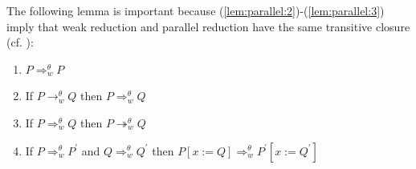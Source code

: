 \documentclass{lmcs} %
\newcommand{\param}{\theta}
\newcommand{\reduces}[2]{\rightarrow_{#1}^{#2}}
\newcommand{\transreduces}[2]{\twoheadrightarrow_{#1}^{#2}}
\newcommand{\Reduces}[2]{\Rightarrow_{#1}^{#2}}
\begin{document}
The following lemma is important because (\ref{lem:parallel:2})-(\ref{lem:parallel:3}) imply that weak reduction and parallel reduction have the same transitive closure (cf. \cite[p. 120 equations (1)-(3)]{Takahashi1995-kp}):
\begin{lem}\label{lem:parallel}\hfill
\begin{enumerate}[leftmargin=*]
    \item\label{lem:parallel:1} $P\Reduces{w}{\param} P$ 
    \item\label{lem:parallel:2} If $P\reduces{w}{\param} Q$ then $P\Reduces{w}{\param} Q$
    \item\label{lem:parallel:3} If $P\Reduces{w}{\param} Q$ then $P\transreduces{w}{\param} Q$ 
    \item\label{lem:parallel:4} If $P\Reduces{w}{\param} P^{\prime}$ and $Q\Reduces{w}{\param} Q^{\prime}$ then $P[x:=Q]\Reduces{w}{\param} P^{\prime}[x:=Q^{\prime}]$
\end{enumerate}
\end{lem}
\end{document}
